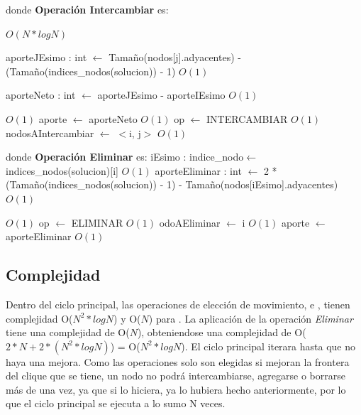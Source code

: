 \documentclass[a4paper, 10pt, twoside]{article}
\newenvironment{pseudo}[1][]{%
    \vspace{1em}%
    \begin{algorithmic}%
}
{%
    \end{algorithmic}%
    \vspace{1em}%
}
\newcommand{\Ode}[1]{\hfill $O(#1)$}
\begin{document}
\begin{pseudo}
\State
\State donde \textbf{Operación Intercambiar} es:
\State

											\Ode{N*log N}

					\State aporteJEsimo : int $\leftarrow$ Tamaño(nodos[j].adyacentes) -
					\State (Tamaño(indices\_nodos(solucion)) - 1)															\Ode{1}

					\State aporteNeto : int $\leftarrow$ aporteJEsimo - aporteIEsimo										\Ode{1}

																									\Ode{1}
						\State aporte $\leftarrow$ aporteNeto																\Ode{1}
						\State op $\leftarrow$ INTERCAMBIAR 																\Ode{1}
						\State nodosAIntercambiar $\leftarrow$ $<$i, j$>$ 													\Ode{1}
					\EndIf
				\EndIf
			\EndFor	

\State
\State donde \textbf{Operación Eliminar} es:
\State
			\State iEsimo : indice\_nodo$\leftarrow$ indices\_nodos(solucion)[i]											\Ode{1}
			\State aporteEliminar : int $\leftarrow$ 2 * (Tamaño(indices\_nodos(solucion)) - 1) - 
			\State Tamaño(nodos[iEsimo].adyacentes)																			\Ode{1}

																								\Ode{1}
				\State op $\leftarrow$ ELIMINAR 																			\Ode{1}
				\State odoAEliminar $\leftarrow$ i 																			\Ode{1}
				\State aporte $\leftarrow$ aporteEliminar 																	\Ode{1}
			\EndIf
		\EndFor


\end{pseudo}

\subsection{Complejidad}
Dentro del ciclo principal, las operaciones de elección de movimiento,  e , tienen complejidad O($N^2 * log N$) y O($N$) para . La aplicación de la operación \textit{Eliminar} tiene una complejidad de O($N$), obteniendose una complejidad de O($2*N + 2*(N^2 * log N)$) = O($N^2 * log N$).
El ciclo principal iterara hasta que no haya una mejora. Como las operaciones solo son elegidas si mejoran la frontera del clique que se tiene, un nodo no podrá intercambiarse, agregarse o borrarse más de una vez, ya que si lo hiciera, ya lo hubiera hecho anteriormente, por lo que el ciclo principal se ejecuta a lo sumo N veces.
\end{document}
